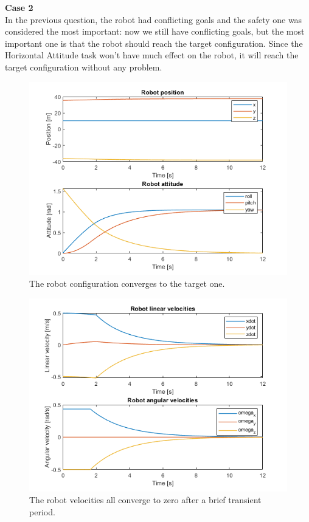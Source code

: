 \documentclass{article}
\begin{document}
{\large \textbf{Case 2}} \\
In the previous question, the robot had conflicting goals and the safety one was considered the most important: now we still have conflicting goals, but the most important one is that the robot should reach the target configuration. Since the Horizontal Attitude task won't have much effect on the robot, it will reach the target configuration without any problem.
\begin{figure}[H]
	\centering
	\includegraphics[width=0.7\linewidth]{images/Ex1/HorAtt_LowPrio_SameStartpos_DifferentEndpos_PosAndAtt}
	\caption{The robot configuration converges to the target one.}
	\label{fig:q3case2a}
\end{figure}
\begin{figure}[H]
	\centering
	\includegraphics[width=0.7\linewidth]{images/Ex1/HorAtt_LowPrio_SameStartpos_DifferentEndpos_LinAngVelocities}
	\caption{The robot velocities all converge to zero after a brief transient period.}
	\label{fig:q3case2b}
\end{figure}
\end{document}
